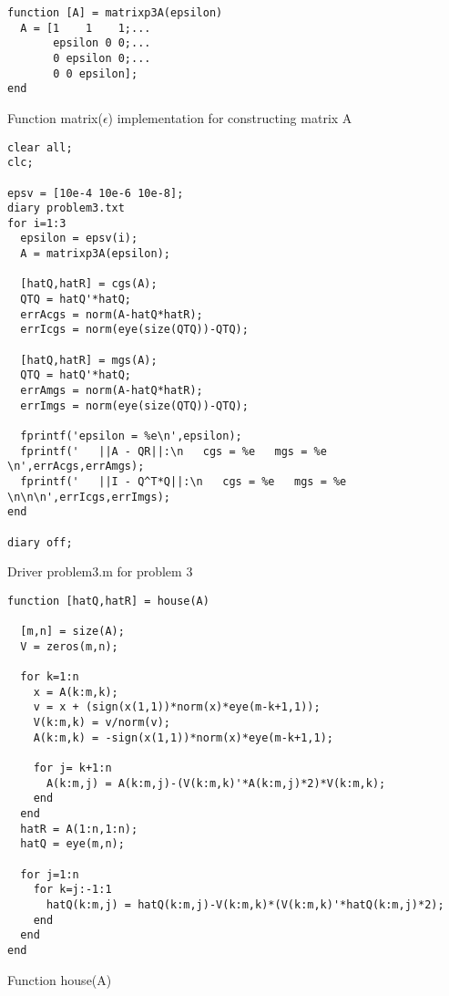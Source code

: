 \documentclass[10pt]{article}
\begin{document}
\begin{program}
\begin{verbatim}
function [A] = matrixp3A(epsilon)
  A = [1    1    1;...
       epsilon 0 0;...
       0 epsilon 0;...
       0 0 epsilon]; 
end
\end{verbatim}
  \caption{Function matrix($\epsilon$) implementation for constructing matrix A}
\end{program}

\begin{program}
\begin{verbatim}
clear all;
clc;

epsv = [10e-4 10e-6 10e-8];
diary problem3.txt
for i=1:3
  epsilon = epsv(i);
  A = matrixp3A(epsilon);

  [hatQ,hatR] = cgs(A);
  QTQ = hatQ'*hatQ;
  errAcgs = norm(A-hatQ*hatR);
  errIcgs = norm(eye(size(QTQ))-QTQ);

  [hatQ,hatR] = mgs(A);
  QTQ = hatQ'*hatQ;
  errAmgs = norm(A-hatQ*hatR);
  errImgs = norm(eye(size(QTQ))-QTQ);

  fprintf('epsilon = %e\n',epsilon);
  fprintf('   ||A - QR||:\n   cgs = %e   mgs = %e \n',errAcgs,errAmgs);
  fprintf('   ||I - Q^T*Q||:\n   cgs = %e   mgs = %e \n\n\n',errIcgs,errImgs);
end

diary off;
\end{verbatim}
  \caption{Driver problem3.m for problem 3}
\end{program}


\begin{program}
\begin{verbatim}
function [hatQ,hatR] = house(A)
  
  [m,n] = size(A);
  V = zeros(m,n);

  for k=1:n
    x = A(k:m,k);
    v = x + (sign(x(1,1))*norm(x)*eye(m-k+1,1));
    V(k:m,k) = v/norm(v);
    A(k:m,k) = -sign(x(1,1))*norm(x)*eye(m-k+1,1);
    
    for j= k+1:n
      A(k:m,j) = A(k:m,j)-(V(k:m,k)'*A(k:m,j)*2)*V(k:m,k);
    end
  end
  hatR = A(1:n,1:n);
  hatQ = eye(m,n);

  for j=1:n
    for k=j:-1:1
      hatQ(k:m,j) = hatQ(k:m,j)-V(k:m,k)*(V(k:m,k)'*hatQ(k:m,j)*2);  
    end
  end
end
\end{verbatim}
  \label{fig:house}
  \caption{Function house(A)}
\end{program}
\end{document}

